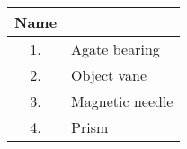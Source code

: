 \begin{tabular}[12pt]{ |c|l| }
  \hline
  \textbf{Name} & \\ \hline
  1. & Agate bearing \\ \hline
  2. & Object vane \\ \hline
  3. & Magnetic needle \\ \hline
  4. & Prism \\ \hline
\end{tabular}
